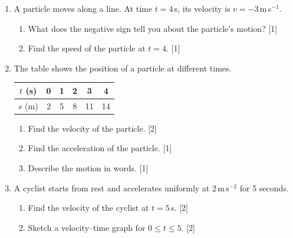 \documentclass[12pt, twoside]{article}
\begin{document}
\begin{enumerate}[itemsep=0.25cm]
\item A particle moves along a line. At time $t=4$\,s, its velocity is $v = -3$\,m\,s$^{-1}$.
\begin{enumerate}[itemsep=0.15cm]
  \item What does the negative sign tell you about the particle's motion? \hfill [1]
  \item Find the speed of the particle at $t=4$. \hfill [1]
\end{enumerate}

\item The table shows the position of a particle at different times.

\renewcommand{\arraystretch}{1.3}
\begin{center}
\begin{tabular}{|c|c|c|c|c|c|}
  \hline
  $t$ (s) & 0 & 1 & 2 & 3 & 4 \\
  \hline
  $s$ (m) & 2 & 5 & 8 & 11 & 14 \\
  \hline
\end{tabular}
\end{center}
\vspace{-0.2cm}

\begin{enumerate}[itemsep=0.15cm]
  \item Find the velocity of the particle. \hfill [2]
  \item Find the acceleration of the particle. \hfill [1]
  \item Describe the motion in words. \hfill [1]
\end{enumerate}

\item A cyclist starts from rest and accelerates uniformly at
      $2$\,m\,s$^{-2}$ for 5 seconds.
\begin{enumerate}[itemsep=0.15cm]
  \item Find the velocity of the cyclist at $t=5$\,s. \hfill [2]
  \item Sketch a velocity--time graph for $0 \leq t \leq 5$. \hfill [2]
\end{enumerate}

\end{enumerate}
\end{document}
